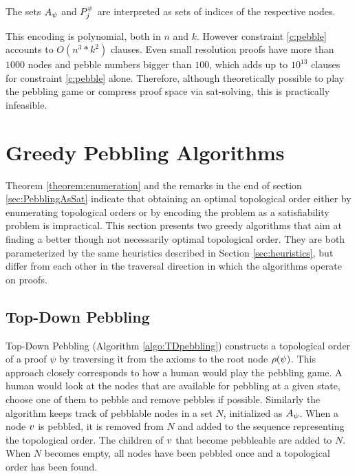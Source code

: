 \documentclass{llncs}
\begin{document}
The sets $A_{\psi}$ and $P_{j}^{\psi}$ are interpreted as sets of indices of the respective nodes.

\noindent
This encoding is polynomial, both in $n$ and $k$. However constraint \ref{c:pebble} accounts to $O(n^3*k^2)$ clauses. Even small resolution proofs have more than $1000$ nodes and pebble numbers bigger than $100$, which adds up to $10^{13}$ clauses for constraint \ref{c:pebble} alone. Therefore, although theoretically possible to play the pebbling game or compress proof space via sat-solving, this is practically infeasible.


\section{Greedy Pebbling Algorithms}
\label{section:algorithms}

Theorem \ref{theorem:enumeration} and the remarks in the end of section \ref{sec:PebblingAsSat} indicate that obtaining an optimal topological order either by enumerating topological orders or by encoding the problem as a satisfiability problem is impractical. This section presents two greedy algorithms that aim at finding a better though not necessarily optimal topological order. They are both parameterized by the same heuristics described in Section \ref{sec:heuristics}, but differ from each other in the traversal direction in which the algorithms operate on proofs.

\subsection{Top-Down Pebbling}

Top-Down Pebbling (Algorithm \ref{algo:TDpebbling}) constructs a topological order of a proof $\psi$ by traversing it from the axioms to the root node $\rho(\psi)$.
This approach closely corresponds to how a human would play the pebbling game. 
A human would look at the nodes that are available for pebbling at a given state, choose one of them to pebble and remove pebbles if possible.
Similarly the algorithm keeps track of pebblable nodes in a set $N$, initialized as $A_{\psi}$.
When a node $v$ is pebbled, it is removed from $N$ and added to the sequence representing the topological order. The children of $v$ that become pebbleable are added to $N$.
When $N$ becomes empty, all nodes have been pebbled once and a topological order has been found.
\end{document}

